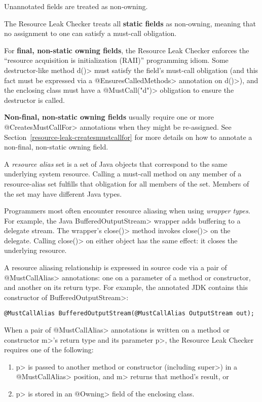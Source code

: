 
Unannotated fields are treated as non-owning.

The Resource Leak Checker treats all \textbf{static fields} as non-owning, meaning that no assignment to one
can satisfy a must-call obligation.

For \textbf{final, non-static owning fields},
the Resource Leak Checker enforces the ``resource acquisition is
initialization (RAII)'' programming idiom.  Some
destructor-like method \<d()> must satisfy the field's must-call obligation
(and this fact must be expressed via a \<@EnsuresCalledMethods> annotation on \<d()>),
and the enclosing class must have a \<@MustCall("d")> obligation to
ensure the destructor is called.

\textbf{Non-final, non-static owning fields} usually require one or more \<@CreatesMustCallFor> annotations
when they might be re-assigned. See Section~\ref{resource-leak-createsmustcallfor} for
more details on how to annotate a non-final, non-static owning field.



A \emph{resource alias} set is a set of Java objects that
correspond to the same underlying system resource.
Calling a must-call method on any member of a resource-alias set
fulfills that obligation for all members of the set.
Members of the set may have different Java types.

Programmers most often encounter resource aliasing when using \emph{wrapper types}.
For example, the Java \<Buffered\-Output\-Stream> wrapper adds buffering to a
delegate stream.
The wrapper's \<close()> method invokes \<close()> on the delegate.  Calling
\<close()> on either object has the same effect:  it closes the underlying resource.

A resource aliasing relationship is expressed in source code via a pair of \<@MustCallAlias> annotations:
one on a parameter of a method or constructor, and another on its return type.
For example, the annotated JDK contains this constructor of \<BufferedOutputStream>:
\begin{Verbatim}
@MustCallAlias BufferedOutputStream(@MustCallAlias OutputStream out);
\end{Verbatim}

When a pair of \<@MustCallAlias> annotations is written on a method or constructor \<m>'s return type
and its parameter \<p>, the Resource Leak Checker requires one of the following:
\begin{enumerate}
\item \<p> is passed to another method or constructor (including \<super>) in a
  \<@MustCallAlias> position, and \<m> returns that method's result, or
\item \<p> is stored in an \<@Owning> field of the enclosing class.
\end{enumerate}


